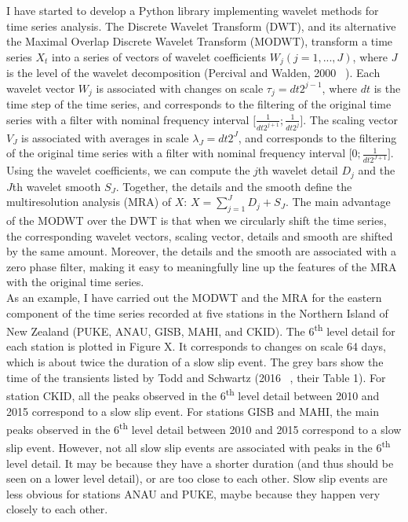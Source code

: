 \documentclass[letterpaper, 12pt]{article}
\begin{document}
I have started to develop a Python library implementing wavelet methods for time series analysis. The Discrete Wavelet Transform (DWT), and its alternative the Maximal Overlap Discrete Wavelet Transform (MODWT), transform a time series $X_t$ into a series of vectors of wavelet coefficients $W_j \left(  j= 1 , ... , J \right)$, where $J$ is the level of the wavelet decomposition (Percival and Walden, 2000 ~\cite{PER_2000}). Each wavelet vector $W_j$ is associated with changes on scale $\tau_j = dt 2^{j - 1}$, where $dt$ is the time step of the time series, and corresponds to the filtering of the original time series with a filter with nominal frequency interval $\lbrack \frac{1}{dt 2^{j + 1}} ; \frac{1}{dt 2^j} \rbrack$. The scaling vector $V_J$ is associated with averages in scale $\lambda_J = dt 2^J$, and corresponds to the filtering of the original time series with a filter with nominal frequency interval $\lbrack 0 ; \frac{1}{dt 2^{J + 1}} \rbrack$. Using the wavelet coefficients, we can compute the $j$th wavelet detail $D_j$ and the $J$th wavelet smooth $S_J$. Together, the details and the smooth define the multiresolution analysis (MRA) of $X$: $X = \sum_{j = 1}^{J} D_j + S_J$. The main advantage of the MODWT over the DWT is that when we circularly shift the time series, the corresponding wavelet vectors, scaling vector, details and smooth are shifted by the same amount. Moreover, the details and the smooth are associated with a zero phase filter, making it easy to meaningfully line up the features of the MRA with the original time series. \\

As an example, I have carried out the MODWT and the MRA for the eastern component of the time series recorded at five stations in the Northern Island of New Zealand (PUKE, ANAU, GISB, MAHI, and CKID). The 6\textsuperscript{th} level detail for each station is plotted in Figure X. It corresponds to changes on scale 64 days, which is about twice the duration of a slow slip event. The grey bars show the time of the transients listed by Todd and Schwartz (2016 ~\cite{TOD_2016}, their Table 1). For station CKID, all the peaks observed in the 6\textsuperscript{th} level detail between 2010 and 2015 correspond to a slow slip event. For stations GISB and MAHI, the main peaks observed in the 6\textsuperscript{th} level detail between 2010 and 2015 correspond to a slow slip event. However, not all slow slip events are associated with peaks in the 6\textsuperscript{th} level detail. It may be because they have a shorter duration (and thus should be seen on a lower level detail), or are too close to each other. Slow slip events are less obvious for stations ANAU and PUKE, maybe because they happen very closely to each other. \\
\end{document}
